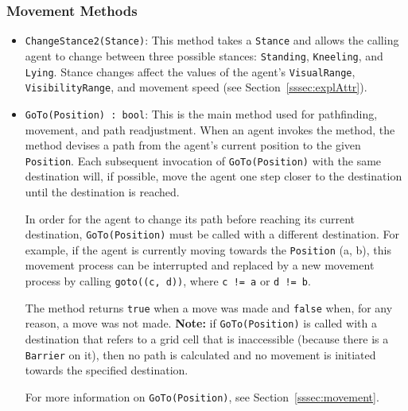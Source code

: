 \documentclass[
  a4paper,
  english,
  DIV=16,
  11pt,
  parskip=half,
  dvipsnames,
  listof=totoc,		     %
  index=totoc,		     %
  bibliography=totoc,	 %
]{scrartcl}
\begin{document}
\subsubsection{Movement Methods} \label{sssec:movMeth}
\begin{itemize}
  \item \texttt{ChangeStance2(Stance)}: This method takes a \texttt{Stance} and allows the calling agent to change between three possible stances: \texttt{Standing}, \texttt{Kneeling}, and \texttt{Lying}. Stance changes affect the values of the agent's \texttt{VisualRange}, \texttt{VisibilityRange}, and movement speed (see Section~\ref{sssec:explAttr}).
  \item \texttt{GoTo(Position) :~bool}: This is the main method used for pathfinding, movement, and path readjustment. When an agent invokes the method, the method devises a path from the agent's current position to the given \texttt{Position}. Each subsequent invocation of \texttt{GoTo(Position)} with the same destination will, if possible, move the agent one step closer to the destination until the destination is reached.
  
  In order for the agent to change its path before reaching its current destination, \texttt{GoTo(Position)} must be called with a different destination. For example, if the agent is currently moving towards the \texttt{Position} (a, b), this movement process can be interrupted and replaced by a new movement process by calling \texttt{goto((c, d))}, where \texttt{c != a} or \texttt{d != b}.
  
  The method returns \texttt{true} when a move was made and \texttt{false} when, for any reason, a move was not made. \textbf{Note:} if \texttt{GoTo(Position)} is called with a destination that refers to a grid cell that is inaccessible (because there is a \texttt{Barrier} on it), then no path is calculated and no movement is initiated towards the specified destination.
  
  For more information on \texttt{GoTo(Position)}, see Section~\ref{sssec:movement}.
\end{itemize}
%
\end{document}

